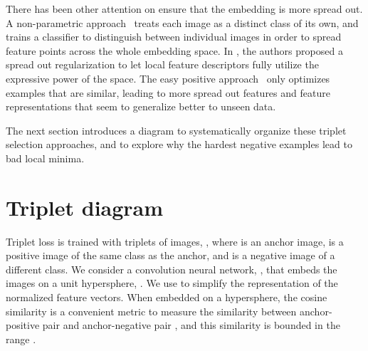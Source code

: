 \documentclass[runningheads]{llncs}
\begin{document}
There has been other attention on ensure that the embedding is more spread out.  A non-parametric approach~\cite{Wu_2018_CVPR} treats each image as a distinct class of its own, and trains a classifier to distinguish between individual images in order to spread feature points across the whole embedding space. In \cite{Zhang_2017_ICCV}, the authors proposed a spread out regularization to let local feature descriptors fully utilize the expressive power of the space. The easy positive approach~\cite{xuan2019improved} only optimizes examples that are similar, leading to more spread out features and feature representations that seem to generalize better to unseen data.

The next section introduces a diagram to systematically organize these triplet selection approaches, and to explore why the hardest negative examples lead to bad local minima.

\section{Triplet diagram}
\label{sec:diagram}

Triplet loss is trained with triplets of images, , where  is an anchor image,  is a positive image of the same class as the anchor, and  is a negative image of a different class.  We consider a convolution neural network, , that embeds the images on a unit hypersphere, . We use  to simplify the representation of the normalized feature vectors.  When embedded on a hypersphere, the cosine similarity is a convenient metric to measure the similarity between anchor-positive pair  and anchor-negative pair , and this similarity is bounded in the range . 
\end{document}
